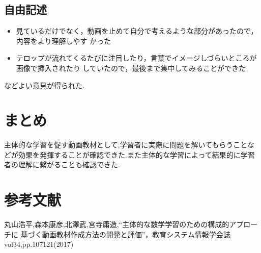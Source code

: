 \documentclass[a4j,10pt]{jsarticle}
\begin{document}
\subsection{自由記述}
\begin{itemize}
 \item 見ているだけでなく，動画を止めて自分で考えるような部分があったので，内容をより理解しやす
かった
 \item テロップが流れてくるたびに注目したり，言葉でイメージしづらいところが画像で挿入されたり
していたので，最後まで集中してみることができた 
\end{itemize}
などよい意見が得られた.

\section{まとめ}
主体的な学習を促す動画教材として,学習者に実際に問題を解いてもらうことなどが効果を発揮することが確認できた.また主体的な学習によって結果的に学習者の理解に繋がることも確認できた.

\section{参考文献}
\label{sec:kihon}
丸山浩平,森本康彦,北澤武,宮寺庸造,“主体的な数学学習のための構成的アプローチに
基づく動画教材作成方法の開発と評価”，教育システム情報学会誌vol34,pp.107121(2017)
  
\end{document}
